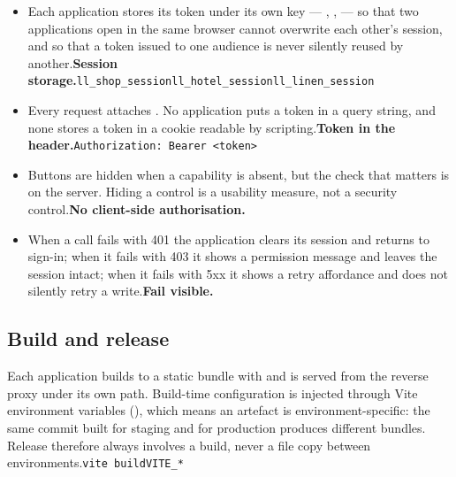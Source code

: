 \documentclass[11pt,a4paper,oneside]{book}
\begin{document}
\begin{itemize}
\item Each application stores its token under its own key — , ,  — so that two applications open in the same browser cannot overwrite each other's session, and so that a token issued to one audience is never silently reused by another.\textbf{Session storage.}\texttt{ll\_shop\_session}\texttt{ll\_hotel\_session}\texttt{ll\_linen\_session}
\item Every request attaches . No application puts a token in a query string, and none stores a token in a cookie readable by scripting.\textbf{Token in the header.}\texttt{Authorization: Bearer <token>}
\item Buttons are hidden when a capability is absent, but the check that matters is on the server. Hiding a control is a usability measure, not a security control.\textbf{No client-side authorisation.}
\item When a call fails with 401 the application clears its session and returns to sign-in; when it fails with 403 it shows a permission message and leaves the session intact; when it fails with 5xx it shows a retry affordance and does not silently retry a write.\textbf{Fail visible.}
\end{itemize}
\subsection*{Build and release}
Each application builds to a static bundle with  and is served from the reverse proxy under its own path. Build-time configuration is injected through Vite environment variables (), which means an artefact is environment-specific: the same commit built for staging and for production produces different bundles. Release therefore always involves a build, never a file copy between environments.\texttt{vite build}\texttt{VITE\_*}
\end{document}
